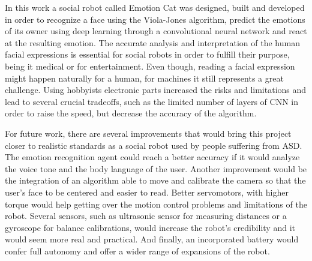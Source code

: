 \documentclass[runningheads,a4paper,12pt]{report}
\begin{document}
In this work a social robot called Emotion Cat was designed, built and developed in order to recognize a face using the Viola-Jones algorithm, predict the emotions of its owner using deep learning through a convolutional neural network and react at the resulting emotion. The accurate analysis and interpretation of the human facial expressions is essential for social robots in order to fulfill their purpose, being it medical or for entertainment. Even though, reading a facial expression might happen naturally for a human, for machines it still represents a great challenge. Using hobbyists electronic parts increased the risks and limitations and lead to several crucial tradeoffs, such as the limited number of layers of CNN in order to raise the speed, but decrease the accuracy of the algorithm. 

For future work, there are several improvements that would bring this project closer to realistic standards as a social robot used by people suffering from ASD. The emotion recognition agent could reach a better accuracy if it would analyze the voice tone and the body language of the user. Another improvement would be the integration of an algorithm able to move and calibrate the camera so that the user's face to be centered and easier to read. Better servomotors, with higher torque would help getting over the motion control problems and limitations of the robot. Several sensors, such as ultrasonic sensor for measuring distances or a gyroscope for balance calibrations, would increase the robot's credibility and it would seem more real and practical. And finally, an incorporated battery would confer full autonomy and offer a wider range of expansions of the robot. 
\end{document}

